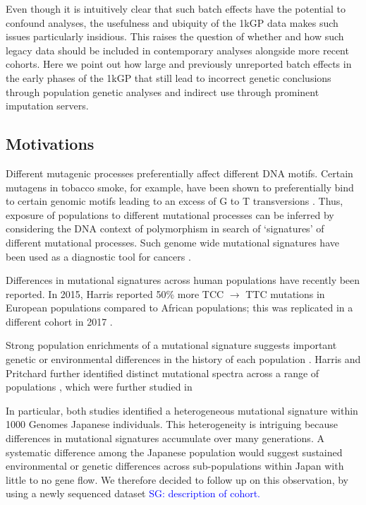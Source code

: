 \documentclass[9pt,lineno]{elife}
\newcommand{\sgcomment}[1]{\textcolor{blue}{SG: #1}}
\begin{document}
Even though it is intuitively clear that such batch effects have the potential to confound analyses, the usefulness and ubiquity of the 1kGP data makes such issues particularly insidious.   This raises the question of whether and how such legacy data should be included in contemporary analyses alongside more recent cohorts. 
Here we point out how large and previously unreported batch effects in the early phases of the 1kGP that still lead to incorrect genetic conclusions through population genetic analyses and indirect use through prominent imputation servers.  

\subsection{Motivations}

Different mutagenic processes preferentially affect different DNA motifs. Certain mutagens in tobacco smoke, for example, have been shown to preferentially bind to certain genomic motifs leading to an excess of G to T transversions \cite{Pleasance2010}. Thus, exposure of populations to different mutational processes can be inferred by considering the DNA context of polymorphism in search of `signatures' of different mutational processes\cite{Pleasance2010}. 
Such genome wide mutational signatures have been used as a diagnostic tool for cancers \cite{Pleasance2010,Shiraishi2015a}.


Differences in mutational signatures across human populations have recently been reported.
In 2015, Harris reported 50\% more TCC ${\rightarrow}$ TTC mutations in European populations compared to African populations; this was replicated in a different cohort in 2017 \cite{Harris2015a}. 

Strong population enrichments of a mutational signature suggests important genetic or environmental differences in the history of each population \cite{Harris2015a}. 
Harris and Pritchard further identified distinct mutational spectra across a range of populations \cite{Harris2017a}, which were further studied in \cite{Voight}
 
 In particular, both studies  identified a heterogeneous mutational signature within 1000 Genomes Japanese individuals.
This heterogeneity is intriguing because differences in mutational signatures accumulate over many generations.
A systematic difference among the Japanese population would suggest sustained environmental or genetic differences across sub-populations within Japan with little to no gene flow.
We therefore decided to follow up on this observation, by using a newly sequenced dataset \sgcomment{description of cohort.}
\end{document}
